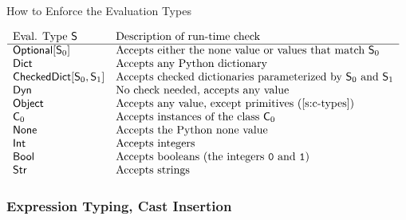 \documentclass[english,cleveref,submission]{programming}
\newcommand{\code}[1]{\texttt{#1}}
\newcommand{\typefont}[1]{\mathsf{#1}}
\newcommand{\paramtype}[2]{#1[#2]}
\newcommand{\spteval}{\typefont{S}}
\newcommand{\sptclass}{\typefont{C}}
\newcommand{\sptint}{\typefont{Int}}
\newcommand{\sptstr}{\typefont{Str}}
\newcommand{\sptbool}{\typefont{Bool}}
\newcommand{\sptdyn}{\typefont{Dyn}}
\newcommand{\sptobject}{\typefont{Object}}
\newcommand{\sptnone}{\typefont{None}}
\newcommand{\sptoptional}[1]{\paramtype{\typefont{Optional}}{#1}}
\newcommand{\sptrawpydict}{\typefont{Dict}}
\newcommand{\sptrawchkdict}{\typefont{CheckedDict}} %
\newcommand{\sptchkdict}[2]{\paramtype{\sptrawchkdict}{#1, #2}}
\begin{document}
\begin{table}[t]
  \caption{How to Enforce the Evaluation Types}
  \label{t:cast}

  \centering
  \(\begin{array}{l@{\quad}l}
    \mbox{Eval. Type $\spteval$} & \mbox{Description of run-time check} \\\hline
    \sptoptional{\spteval_0} & \mbox{Accepts either the none value or values that match $\spteval_0$} \\
    \sptrawpydict & \mbox{Accepts any Python dictionary} \\
    \sptchkdict{\spteval_0}{\spteval_1} & \mbox{Accepts checked dictionaries parameterized by $\spteval_0$ and $\spteval_1$} \\
    \sptdyn & \mbox{No check needed, accepts any value} \\
    \sptobject & \mbox{Accepts any value, except primitives~(\cref{s:c-types})} \\
    \sptclass_0 & \mbox{Accepts instances of the class $\sptclass_0$} \\
    \sptnone & \mbox{Accepts the Python none value} \\
    \sptint & \mbox{Accepts integers} \\
    \sptbool & \mbox{Accepts booleans (the integers \code{0} and \code{1})} \\
    \sptstr & \mbox{Accepts strings}
  \end{array}\)
\end{table}


\subsubsection{Expression Typing, Cast Insertion}
\end{document}
